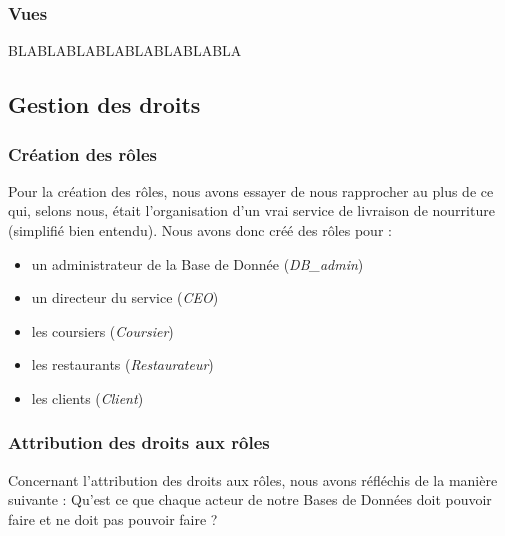 \documentclass[french]{article}
\begin{document}
            \subsubsection*{Vues}
            BLABLABLABLABLABLABLABLA

        \subsection*{Gestion des droits}
            \subsubsection*{Création des rôles}
                Pour la création des rôles, nous avons essayer de nous rapprocher au plus de ce qui, selons nous, était l'organisation d'un vrai service de livraison de nourriture (simplifié bien entendu).
                Nous avons donc créé des rôles pour : 
                \begin{itemize}
                    \item un administrateur de la Base de Donnée (\textit{DB\_admin})
                    \item un directeur du service (\textit{CEO})
                    \item les coursiers (\textit{Coursier})
                    \item les restaurants (\textit{Restaurateur})
                    \item les clients (\textit{Client})
                \end{itemize}
            
            \subsubsection*{Attribution des droits aux rôles}
                Concernant l'attribution des droits aux rôles, nous avons réfléchis de la manière suivante : Qu'est ce que chaque acteur de notre Bases de Données doit pouvoir faire et ne doit pas pouvoir faire ?
\end{document}
